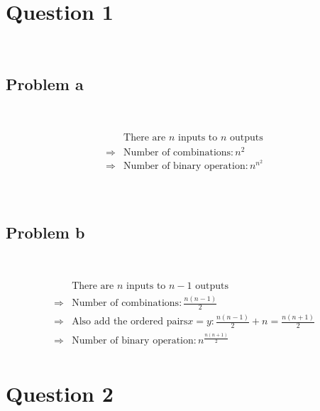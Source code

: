 \documentclass{article}
\begin{document}
\section*{Question 1}

~

\subsection*{Problem a}

~

\begin{equation*}
    \begin{split}
        &\text{There are }n\text{ inputs to }n\text{ outputs}\\
        \Rightarrow&\text{Number of combinations}:n^2\\
        \Rightarrow&\text{Number of binary operation}:n^{n^2}\\
    \end{split}
\end{equation*}

~

\subsection*{Problem b}

~

\begin{equation*}
    \begin{split}
        &\text{There are }n\text{ inputs to }n-1\text{ outputs}\\
        \Rightarrow&\text{Number of combinations}:\frac{n(n-1)}{2}\\
        \Rightarrow&\text{Also add the ordered pairs}x=y:\frac{n(n-1)}{2}+n=\frac{n(n+1)}{2}\\
        \Rightarrow&\text{Number of binary operation}:n^{\frac{n(n+1)}{2}}\\
    \end{split}
\end{equation*}

\newpage

\section*{Question 2}

~
\end{document}
